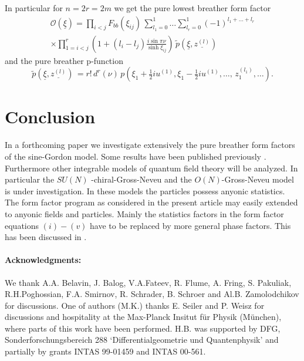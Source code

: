 \documentclass[a4paper,a4paper]{article}
\begin{document}
In particular for $n=2r=2m$ we get the pure lowest breather form factor 
\begin{multline*}
\mathcal{O}(\underline{\xi })=\prod_{i<j}F_{bb}(\xi
_{ij})\,\sum_{l_{1}=0}^{1}\dots \sum_{l_{r}=0}^{1}(-1)^{l_{1}+\dots +l_{r}}
\\
\times \prod_{1=i<j}^{r}\left( 1+(l_{i}-l_{j})\frac{i\sin \pi \nu }{\sinh
\xi _{ij}}\right) \,\tilde{p}(\underline{\xi },\underline{z^{(l)}})
\end{multline*}
and the pure breather p-function 
\[
\tilde{p}(\underline{\xi },\underline{z^{(l)}})\,=r!\,d^{r}(\nu )\,p\left(
\xi _{1}+\tfrac{1}{2}iu^{(1)},\xi _{1}-\tfrac{1}{2}iu^{(1)},\dots
,\,z_{1}^{(l_{1})},\dots \right) . 
\]

\section{Conclusion}

\label{s8}

In a forthcoming paper \cite{BK} we investigate extensively the pure
breather form factors of the sine-Gordon model. Some results have been
published previously \cite{BK1}. Furthermore other integrable models of
quantum field theory will be analyzed. In particular the $SU(N)$%
-chiral-Gross-Neveu \cite{BFKZ1} and the $O(N)$-Gross-Neveu \cite{BK3} model
is under investigation. In these models the particles possess anyonic
statistics. The form factor program as considered in the present article may
easily extended to anyonic fields and particles. Mainly the statistics
factors in the form factor equations $(i)-(v)$ have to be replaced by more
general phase factors. This has been discussed in \cite{Sm,YuZ,Lu,Lu2}.

\paragraph{Acknowledgments:}

We thank A.A. Belavin, J. Balog, V.A.Fateev, R. Flume, A. Fring,
S. Pakuliak, R.H.Poghossian, 
F.A. Smirnov, R. Schrader, B. Schroer and Al.B. Zamolodchikov
for discussions. One of authors (M.K.) thanks E. Seiler and P. Weisz for
discussions and hospitality at the Max-Planck Insitut f\"{u}r Physik
(M\"{u}nchen), where parts of this work have been performed. H.B. was
supported by DFG, Sonderforschungsbereich 288 `Differentialgeometrie und
Quantenphysik' and partially by grants INTAS 99-01459 and INTAS 00-561.

\appendix
\end{document}
